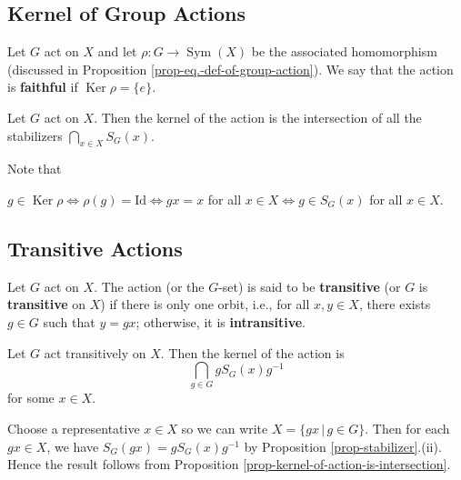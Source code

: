 \subsection{Kernel of Group Actions}
\begin{definition}
	Let $G$ act on $X$ and let $\rho:G\rightarrow \operatorname{Sym}(X)$ be the associated homomorphism (discussed in Proposition \ref{prop-eq.-def-of-group-action}). We say that the action is \textbf{faithful} if $\operatorname{Ker} \rho = \{e\}$.
\end{definition}
\begin{proposition} \label{prop-kernel-of-action-is-intersection}
	Let $G$ act on $X$. Then the kernel of the action is the intersection of all the stabilizers $\bigcap_{x\in X}S_G(x)$.
\end{proposition}
\begin{sketch}
	Note that 
	\begin{center}
		$g\in \operatorname{Ker} \rho \iff \rho(g) = \text{Id} \iff gx = x$ for all $x\in X\iff g\in S_G(x)$ for all $x\in X$.
	\end{center} 
\end{sketch}

\subsection{Transitive Actions}
\begin{definition}
	Let $G$ act on $X$. The action (or the $G$-set) is said to be \textbf{transitive} (or $G$ is \textbf{transitive} on $X$) if there is only one orbit, i.e., for all $x,y\in X$, there exists $g\in G$ such that $y = gx$; otherwise, it is \textbf{intransitive}.
\end{definition}
\begin{proposition} \label{prop-kernel-of-transitive-action}
	Let $G$ act transitively on $X$. Then the kernel of the action is 
	\begin{equation*}
		\bigcap_{g\in G} gS_G(x)g^{-1}
	\end{equation*}
	for some $x\in X$.
\end{proposition}
\begin{sketch}
	Choose a representative $x\in X$ so we can write $X=\{gx\,|\, g\in G\}$. Then for each $gx\in X$, we have  $S_G(gx) = gS_G(x)g^{-1}$ by Proposition \ref{prop-stabilizer}.(ii). Hence the result follows from Proposition \ref{prop-kernel-of-action-is-intersection}.
\end{sketch}

